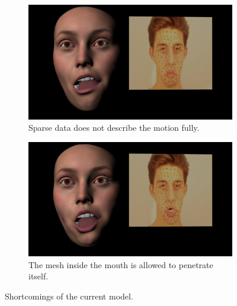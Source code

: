 \begin{figure}
        \centering
        \begin{subfigure}[t]{0.43\textwidth}
                \includegraphics[width=\textwidth]{img/results/Emily_Maya_clean_video_2578}
        \caption{Sparse data does not describe the motion fully.}\label{fig:results3a}
        \end{subfigure}
        \begin{subfigure}[t]{0.43\textwidth}
                \includegraphics[width=\textwidth]{img/results/Emily_Maya_clean_video_2631}
		\caption{The mesh inside the mouth is allowed to penetrate itself.}\label{fig:results3b}        
        \end{subfigure}
        \caption{Shortcomings of the current model.}
        \label{fig:results3}
\end{figure}